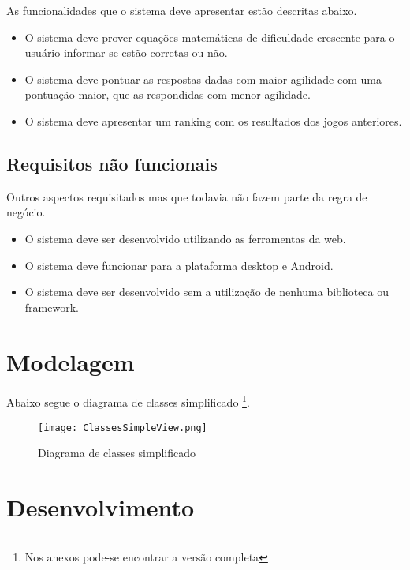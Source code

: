 As funcionalidades que o sistema deve apresentar estão descritas abaixo.

\begin{itemize}
    \item O sistema deve prover equações matemáticas de dificuldade crescente para o usuário informar se estão corretas ou não.
    \item O sistema deve pontuar as respostas dadas com maior agilidade com uma pontuação maior, que as respondidas com menor agilidade.
    \item O sistema deve apresentar um ranking com os resultados dos  jogos anteriores.
\end{itemize}

\subsection{Requisitos não funcionais}

Outros aspectos requisitados mas que todavia não fazem parte da regra de negócio.

\begin{itemize}
    \item O sistema deve ser desenvolvido utilizando as ferramentas da web.
    \item O sistema deve funcionar para a plataforma desktop e Android.
    \item O sistema deve ser desenvolvido sem a utilização de nenhuma biblioteca ou framework.
\end{itemize}

\section{Modelagem}

Abaixo segue o diagrama de classes simplificado \footnote{Nos anexos pode-se encontrar a versão completa}.

\begin{figure}
    \centering
    \texttt{[image: ClassesSimpleView.png]}
	\caption{Diagrama de classes simplificado}
    \label{fig:simpleDiagram}
\end{figure}

\section{Desenvolvimento}

